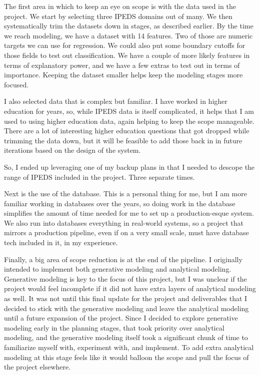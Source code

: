 \documentclass[sigconf, authorversion, nonacm]{acmart}
\begin{document}
    The first area in which to keep an eye on scope is with the data used in the project. We start by selecting three IPEDS domains out of many. We then systematically trim the datasets down in stages, as described earlier. By the time we reach modeling, we have a dataset with 14 features. Two of those are numeric targets we can use for regression. We could also put some boundary cutoffs for those fields to test out classification. We have a couple of more likely features in terms of explanatory power, and we have a few extras to test out in terms of importance. Keeping the dataset smaller helps keep the modeling stages more focused.

    I also selected data that is complex but familiar. I have worked in higher education for years, so, while IPEDS data is itself complicated, it helps that I am used to using higher education data, again helping to keep the scope manageable. There are a lot of interesting higher education questions that got dropped while trimming the data down, but it will be feasible to add those back in in future iterations based on the design of the system.

    So, I ended up leveraging one of my backup plans in that I needed to descope the range of IPEDS included in the project. Three separate times.

    Next is the use of the database. This is a personal thing for me, but I am more familiar working in databases over the years, so doing work in the database simplifies the amount of time needed for me to set up a production-esque system. We also run into databases everything in real-world systems, so a project that mirrors a production pipeline, even if on a very small scale, must have database tech included in it, in my experience.

    Finally, a big area of scope reduction is at the end of the pipeline. I originally intended to implement both generative modeling and analytical modeling. Generative modeling is key to the focus of this project, but I was unclear if the project would feel incomplete if it did not have extra layers of analytical modeling as well. It was not until this final update for the project and deliverables that I decided to stick with the generative modeling and leave the analytical modeling until a future expansion of the project. Since I decided to explore generative modeling early in the planning stages, that took priority over analytical modeling, and the generative modeling itself took a significant chunk of time to familiarize myself with, experiment with, and implement. To add extra analytical modeling at this stage feels like it would balloon the scope and pull the focus of the project elsewhere.
\end{document}
